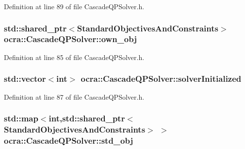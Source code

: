 Definition at line 89 of file Cascade\+Q\+P\+Solver.\+h.

\subsubsection[{\texorpdfstring{own\+\_\+obj}{own_obj}}]{\setlength{\rightskip}{0pt plus 5cm}std\+::shared\+\_\+ptr$<${\bf Standard\+Objectives\+And\+Constraints}$>$ ocra\+::\+Cascade\+Q\+P\+Solver\+::own\+\_\+obj\hspace{0.3cm}{\ttfamily [protected]}}\hypertarget{classocra_1_1CascadeQPSolver_aec6bf15caf1f29d7e1ec5aab696b1e7b}{}\label{classocra_1_1CascadeQPSolver_aec6bf15caf1f29d7e1ec5aab696b1e7b}


Definition at line 85 of file Cascade\+Q\+P\+Solver.\+h.

\subsubsection[{\texorpdfstring{solver\+Initialized}{solverInitialized}}]{\setlength{\rightskip}{0pt plus 5cm}std\+::vector$<$int$>$ ocra\+::\+Cascade\+Q\+P\+Solver\+::solver\+Initialized\hspace{0.3cm}{\ttfamily [protected]}}\hypertarget{classocra_1_1CascadeQPSolver_a9d45b623d0012aae018b8eb8d4a66646}{}\label{classocra_1_1CascadeQPSolver_a9d45b623d0012aae018b8eb8d4a66646}


Definition at line 87 of file Cascade\+Q\+P\+Solver.\+h.

\subsubsection[{\texorpdfstring{std\+\_\+obj}{std_obj}}]{\setlength{\rightskip}{0pt plus 5cm}std\+::map$<$int,std\+::shared\+\_\+ptr$<${\bf Standard\+Objectives\+And\+Constraints}$>$ $>$ ocra\+::\+Cascade\+Q\+P\+Solver\+::std\+\_\+obj\hspace{0.3cm}{\ttfamily [protected]}}\hypertarget{classocra_1_1CascadeQPSolver_aafe2d2d5226c421fc53880570a25a665}{}\label{classocra_1_1CascadeQPSolver_aafe2d2d5226c421fc53880570a25a665}


